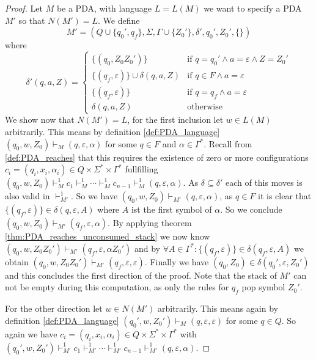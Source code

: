 \begin{proof}
  Let $M$ be a PDA, with language $L=L(M)$ we want to specify a PDA $M'$ so that
  $N(M')=L$. We define
  \[
  M' =(Q\cup\{q_0',q_f\},\Sigma,\Gamma\cup\{Z_0'\},\delta',q_0',Z_0',\{\})
  \]
  where
  \[
  \delta'(q,a,Z) =
  \begin{cases}
    \{(q_0,Z_0Z_0')\} & \text{if } q=q_0'\land a=\varepsilon \land Z=Z_0' \\
    \{(q_f,\varepsilon)\}\cup\delta(q,a,Z)  & \text{if } q\in F\land a=\varepsilon \\
    \{(q_f,\varepsilon)\} & \text{if } q=q_f \land a=\varepsilon \\
    \delta(q,a,Z) & \text{otherwise}
  \end{cases}
  \]
  We show now that $N(M')=L$, for the first inclusion let $w\in L(M)$ arbitrarily.
  This means by definition
  \ref{def:PDA_language} $(q_0,w,Z_0)\vdash_M(q,\varepsilon,\alpha)$ for some $q\in F$ and
  $\alpha\in\Gamma^*$. Recall from \ref{def:PDA_reaches} that this requires the existence
  of zero or more configurations $c_i=(q_i,x_i,\alpha_i)\in Q\times\Sigma^*\times\Gamma^*$
  fullfilling
  $(q_0,w,Z_0)\vdash^1_M c_1\vdash^1_M\cdots\vdash^1_M c_{n-1}\vdash^1_M(q,\varepsilon,\alpha)$.
  As $\delta\subseteq\delta'$ each of this moves is also valid in $\vdash^1_{M'}$.
  So we have $(q_0,w,Z_0)\vdash_{M'}(q,\varepsilon,\alpha)$, as $q\in F$ it is clear that
  $\{(q_f,\varepsilon)\}\in \delta(q,\varepsilon,A)$ where $A$ ist the first symbol of $\alpha$.
  So we conclude  $(q_0,w,Z_0)\vdash_{M'}(q_f,\varepsilon,\alpha)$.
  By applying theorem \ref{thm:PDA_reaches_unconsumed_stack} we now know
  $(q_0,w,Z_0Z_0')\vdash_{M'}(q_f,\varepsilon,\alpha Z_0')$
  and by $\forall A\in\Gamma^*:\{(q_f,\varepsilon)\}\in\delta(q_f,\varepsilon,A)$ we obtain
  $(q_0,w,Z_0Z_0')\vdash_{M'}(q_f,\varepsilon,\varepsilon)$. Finally we have
  $(q_0,Z_0)\in\delta(q_0',\varepsilon,Z_0')$ and this concludes the first direction of
  the proof. Note that the stack of $M'$ can not be empty during this computation, as only the rules
  for $q_f$ pop symbol $Z_0'$.


  For the other direction let  $w\in N(M')$ arbitrarily. This means again by definition
  \ref{def:PDA_language} $(q_0',w,Z_0')\vdash_M(q,\varepsilon,\varepsilon)$ for some $q\in Q$.
  So again we have $c_i=(q_i,x_i,\alpha_i)\in Q\times\Sigma^*\times\Gamma^*$ with
  $(q_0',w,Z_0')\vdash^1_{M'} c_1\vdash^1_{M'}\cdots\vdash^1_{M'} c_{n-1}\vdash^1_{M'}(q,\varepsilon,\alpha)$.


\end{proof}
